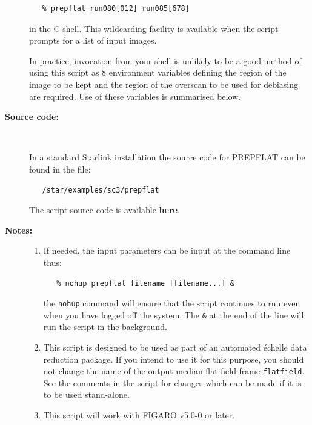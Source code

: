 \documentclass[twoside,11pt]{article}
\newcommand{\htmlref}[2]{#1}
\newcommand{\xref}[3]{#1}
\begin{document}
\begin{description}
\begin{verbatim}
   % prepflat run080[012] run085[678]
\end{verbatim}

     in the C shell.  This wildcarding facility is available when the
     script prompts for a list of input images.

     In practice, invocation from your shell is unlikely to be a good
     method of using this script as 8 environment variables defining
     the region of the image to be kept and the region of the overscan
     to be used for debiasing are required.  Use of these variables is
     summarised below.

\item [{\bf Source code:}] \mbox{} \\
\begin{latex}
In a standard Starlink installation the source code for PREPFLAT can be found
in the file:
\begin{verbatim}
   /star/examples/sc3/prepflat
\end{verbatim}
\end{latex}
\begin{htmlonly}
      The script source code is available
      \htmlref{{\bf here}}{se_prepflat_source}.
\end{htmlonly}

\item [{\bf Notes:}] \mbox{}
\begin{enumerate}
\item If needed, the input parameters can be input at the command
      line thus:

\begin{verbatim}
   % nohup prepflat filename [filename...] &
\end{verbatim}

      the \verb+nohup+ command will ensure that the script continues
      to run even when you have logged off the system.  The \verb+&+ at
      the end of the line will run the script in the background.

\item This script is designed to be used as part of an automated
      \'{e}chelle data reduction package.  If you intend to use it
      for this purpose, you should not change the name of the output
      median flat-field frame \verb+flatfield+.  See the comments in the
      script for changes which can be made if it is to be used
      stand-alone.

\item This script will work with \xref{FIGARO}{sun86}{} v5.0-0 or later.


\end{enumerate}
\end{description}
\end{document}
